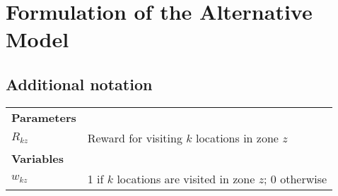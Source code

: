 \newpage
\section{Formulation of the Alternative Model}\label{formulation_alternative}
\stoptocwriting
\subsection{Additional notation}
\begin{tabular}{p{1.5cm} p{12.5cm}}
    \textbf{Parameters}  \\
    $R_{kz}$ & Reward for visiting $k$ locations in zone $z$\\
    \textbf{Variables}  \\
    $w_{kz}$ & 1 if $k$ locations are visited in zone $z$; 0 otherwise
    
\end{tabular}

